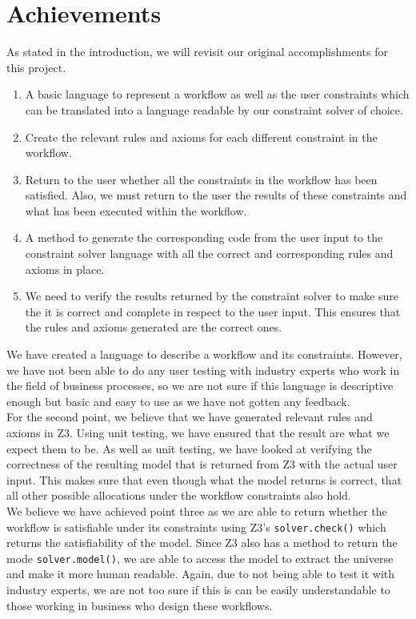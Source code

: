 \documentclass[a4paper]{report}
\begin{document}
\section{Achievements}
As stated in the introduction, we will revisit our original accomplishments for this project.
\begin{enumerate}
\item A basic language to represent a workflow as well as the user constraints which can be translated into a language readable by our constraint solver of choice.
\item Create the relevant rules and axioms for each different constraint in the workflow.
\item Return to the user whether all the constraints in the workflow has been satisfied. Also, we must return to the user the results of these constraints and what has been executed within the workflow.
\item A method to generate the corresponding code from the user input to the constraint solver language with all the correct and corresponding rules and axioms in place. 
\item We need to verify the results returned by the constraint solver to make sure the it is correct and complete in respect to the user input. This ensures that the rules and axioms generated are the correct ones. 
\end{enumerate}

We have created a language to describe  a workflow and its constraints. However, we have not been able to do any user testing with industry experts who work in the field of business processes, so we are not sure if this language is descriptive enough but basic and easy to use as we have not gotten any feedback. \\

For the second point, we believe that we have generated relevant rules and axioms in Z3. Using unit testing, we have ensured that the result are what we expect them to be. As well as unit testing, we have looked at verifying the correctness of the resulting model that is returned from Z3 with the actual user input. This makes sure that even though what the model returns is correct, that all other possible allocations under the workflow constraints also hold. \\

We believe we have achieved point three as we are able to return whether the workflow is satisfiable under its constraints using Z3's \texttt{solver.check()} which returns the satisfiability of the model. Since Z3 also has a method to return the mode \texttt{solver.model()}, we are able to access the model to extract the universe and make it more human readable. Again, due to not being able to test it with industry experts, we are not too sure if this is can be easily understandable to those working in business who design these workflows.  
\end{document}
